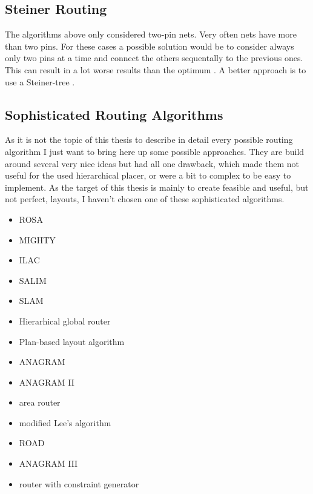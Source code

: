 \subsection{Steiner Routing}
The algorithms above only considered two-pin nets. Very often nets have more than two pins. For these cases a possible solution would be to consider always only two pins at a time and connect the others sequentally to the previous ones. This can result in a lot worse results than the optimum \cite[p. 701]{kaufmann:electronic_design_automation}. A better approach is to use a Steiner-tree \cite[page 153]{springer:eda_analog_routing}.

\subsection{Sophisticated Routing Algorithms}
As it is not the topic of this thesis to describe in detail every possible routing algorithm I just want to bring here up some possible approaches. They are build around several very nice ideas but had all one drawback, which made them not useful for the used hierarchical placer, or were a bit to complex to be easy to implement. As the target of this thesis is mainly to create feasible and useful, but not perfect, layouts, I haven't chosen one of these sophisticated algorithms.
\begin{itemize}
\item ROSA \cite[page 165]{springer:eda_analog_routing}
\item MIGHTY \cite[page 166]{springer:eda_analog_routing}
\item ILAC \cite[page 167]{springer:eda_analog_routing}
\item SALIM \cite[page 167]{springer:eda_analog_routing}
\item SLAM \cite[page 167]{springer:eda_analog_routing}
\item Hierarhical global router \cite[page 168]{springer:eda_analog_routing}
\item Plan-based layout algorithm \cite[page 168]{springer:eda_analog_routing}
\item ANAGRAM \cite[page 168]{springer:eda_analog_routing}
\item ANAGRAM II \cite[page 168]{springer:eda_analog_routing}
\item area router \cite[page 168]{springer:eda_analog_routing}
\item modified Lee's algorithm \cite[page 170]{springer:eda_analog_routing}
\item ROAD \cite[page 170]{springer:eda_analog_routing}
\item ANAGRAM III \cite[page 170]{springer:eda_analog_routing}
\item router with constraint generator \cite[page 172]{springer:eda_analog_routing}
\end{itemize}

